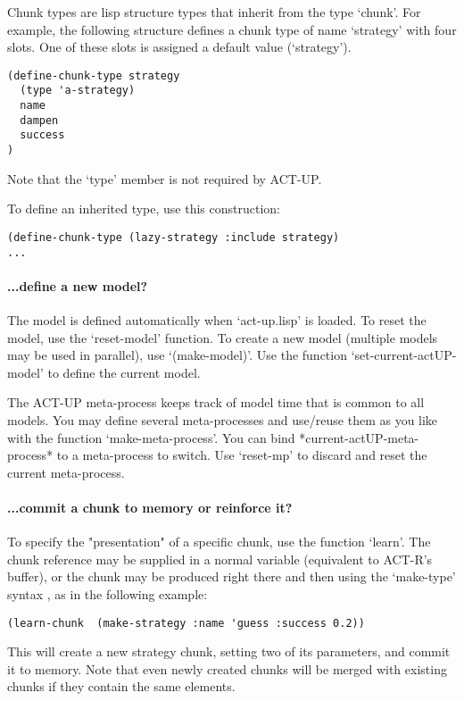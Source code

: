 \documentclass{article}
\begin{document}
Chunk types are lisp structure types that inherit from the type `chunk'.
For example, the following structure defines a chunk type of name `strategy' with four slots.
One of these slots is assigned a default value (`strategy').

\begin{verbatim}
(define-chunk-type strategy
  (type 'a-strategy)
  name
  dampen
  success
)
\end{verbatim}

Note that the `type' member is not required by ACT-UP.

To define an inherited type, use this construction:

\begin{verbatim}
(define-chunk-type (lazy-strategy :include strategy)
...
\end{verbatim}


\paragraph {...define a new model?}

The model is defined automatically when `act-up.lisp' is loaded.  To reset the model, use the `reset-model' function.  To create a new model (multiple models may be used in parallel), use `(make-model)'.  Use the function `set-current-actUP-model' to define the current model.

The ACT-UP meta-process keeps track of model time that is common to all models.  You may define several meta-processes and use/reuse them as you like with the function `make-meta-process'.  You can bind *current-actUP-meta-process* to a meta-process to switch.  Use `reset-mp' to discard and reset the current meta-process.


\paragraph {...commit a chunk to memory or reinforce it?}

To specify the "presentation" of a specific chunk, use the function `learn'.
The chunk reference may be supplied in a normal variable (equivalent to ACT-R's buffer),
or the chunk may be produced right there and then using the `make-type' syntax , as in the following example:

\begin{verbatim}
(learn-chunk  (make-strategy :name 'guess :success 0.2))
\end{verbatim}
This will create a new strategy chunk, setting two of its parameters, and commit it to memory.
Note that even newly created chunks will be merged with existing chunks if they contain the same elements.
\end{document}
